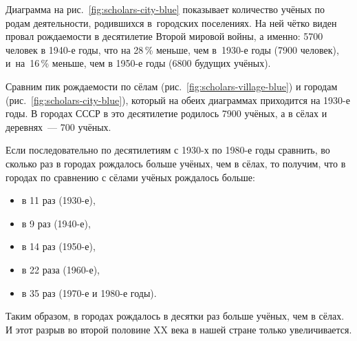 Диаграмма на рис.~\ref{fig:scholars-city-blue} показывает количество учёных по родам деятельности, родившихся в~городских поселениях.
На ней чётко виден провал рождаемости в десятилетие Второй мировой войны, 
а именно: 5700 человек в 1940-е годы, что на 28\,\% меньше, чем в~1930-е годы (7900 человек), 
и~на~16\,\% меньше, чем в 1950-е годы (6800 будущих учёных). 

Сравним пик рождаемости по сёлам (рис.~\ref{fig:scholars-village-blue}) 
                       и городам (рис.~\ref{fig:scholars-city-blue}), 
который на обеих диаграммах приходится на 1930-е годы. 
В городах СССР в это десятилетие родилось 7900 учёных, а в сёлах и деревнях~--- 700 учёных. 

Если последовательно по десятилетиям с 1930-х по 1980-е годы 
сравнить, во сколько раз в городах рождалось больше учёных, чем в сёлах, 
то получим, что в городах по сравнению с сёлами учёных рождалось больше:
\begin{itemize}[noitemsep,topsep=0pt,leftmargin=24pt]
  \item в 11 раз (1930-е), 
  \item в 9 раз (1940-е), 
  \item в 14 раз (1950-е), 
  \item в 22 раза (1960-е), 
  \item в 35 раз (1970-е и 1980-е годы).
\end{itemize}

Таким образом, в городах рождалось в десятки раз больше учёных, чем в сёлах. 
И этот разрыв во второй половине XX века в нашей стране только увеличивается. 
